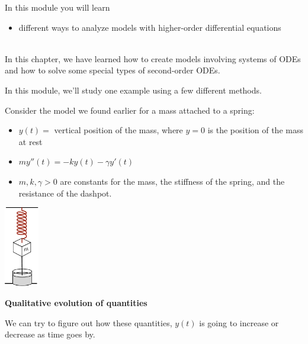 In this module you will learn
\begin{itemize}
	\item different ways to analyze models with higher-order differential equations
\end{itemize}

\hfill \\



In this chapter, we have learned how to create models involving systems of ODEs and how to solve some special types of second-order ODEs.



In this module, we'll study one example using a few different methods.

\begin{example}
Consider the model we found earlier for a mass attached to a spring:

\begin{minipage}{0.85\textwidth}
\begin{itemize}
	\item $y(t)=$ vertical position of the mass, where $y=0$ is the position of the mass at rest
	\item $my''(t) = -k y(t) - \gamma y'(t)$
	\item $m,k,\gamma>0$ are constants for the mass, the stiffness of the spring, and the resistance of the dashpot.
\end{itemize}
\end{minipage}
\begin{minipage}{50pt}
\includegraphics*[height=100pt]{images/module16-spring-mass-dashpot.pdf}	
\end{minipage}
\end{example}

\hfill

\begin{center}
\textbf{\color{cyan}
Qualitative evolution of quantities
}
\end{center}


We can try to figure out how these quantities, $y(t)$ is going to increase or decrease as time goes by. \\

